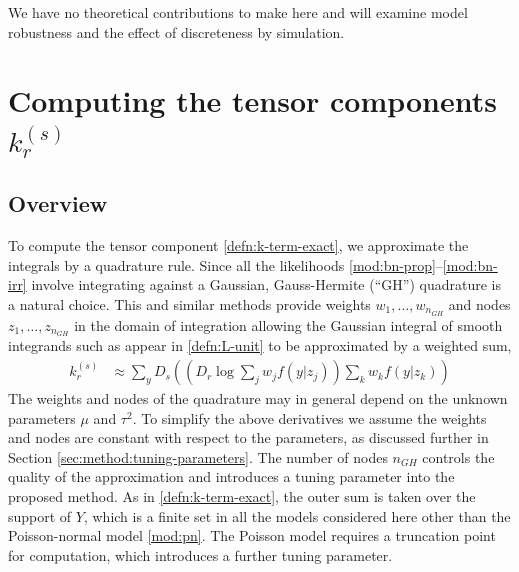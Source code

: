 \documentclass[12pt]{article}
\newcommand{\z}{z}
\newcommand{\Y}{Y}
\renewcommand{\k}{k}
\newcommand{\kterm}{\k_r^{(s)}}
\newcommand{\nGH}{n_{GH}}
\newcommand{\w}{w}
\newcommand{\effect}{\mu}
\newcommand{\comment}[2][red]{%
 \iftoggle{commenttoggle}{%
  {\normalsize{\color{#1}{#2}}\normalsize}%
 }{%
 }%
}
\begin{document}
We have no theoretical contributions to make here and will examine
model robustness and the effect of discreteness by
simulation. %


\section{Computing the tensor components $\kterm$}
\label{sec:method}


\subsection{Overview}
\label{sec:method-overview}

To compute the tensor component \eqref{defn:k-term-exact}, we approximate the integrals
by a quadrature rule. Since all the likelihoods \eqref{mod:bn-prop}--\eqref{mod:bn-irr} involve
integrating against a Gaussian, Gauss-Hermite (``GH'') quadrature is a natural
choice. This and similar methods \citep{liu:94} provide
weights $\w_1,\ldots,\w_{\nGH}$ and nodes $\z_1,\ldots,\z_{\nGH}$ in
the domain of integration allowing the Gaussian integral of smooth
integrands such as appear in \eqref{defn:L-unit} to be approximated by a weighted
sum,
\begin{align}
    k_r^{(s)} 
  &\approx  \sum_y D_s\left( \left(D_r \log\sum_{j} \w_j  f(y|\z_j)\right)  \sum_k \w_k f(y|\z_k)\right)
    \label{defn:k-term-approximate}
\end{align}
The weights and nodes of the quadrature may in general depend on the
unknown parameters $\effect$ and $\tau^2$. To simplify the above
derivatives we assume the weights and nodes are constant with respect to the
parameters, as discussed further in Section \ref{sec:method:tuning-parameters}. The number of nodes $\nGH$
controls the quality of the approximation and introduces a tuning
parameter into the proposed method.  As in \eqref{defn:k-term-exact},
the outer sum is taken over the support of $\Y$, which is a finite set
in all the models considered here other than the Poisson-normal model \eqref{mod:pn}. The
Poisson model requires a truncation point for computation, which
introduces a further tuning parameter.
\end{document}
